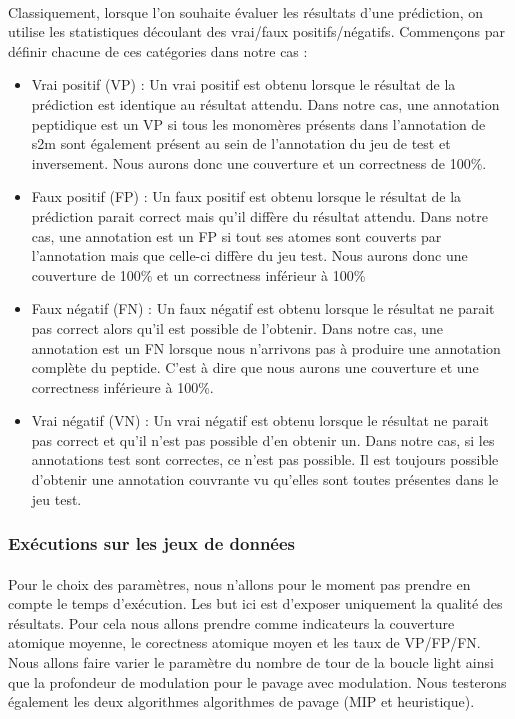 \documentclass[12pt,french,twoside]{report}
\begin{document}
\paragraph{}Classiquement, lorsque l'on souhaite évaluer les résultats d'une prédiction, on utilise les statistiques découlant des vrai/faux positifs/négatifs.
Commençons par définir chacune de ces catégories dans notre cas :
\begin{itemize}
 \item Vrai positif (VP) : Un vrai positif est obtenu lorsque le résultat de la prédiction est identique au résultat attendu.
Dans notre cas, une annotation peptidique est un VP si tous les monomères présents dans l'annotation de s2m sont également présent au sein de l'annotation du jeu de test et inversement.
Nous aurons donc une couverture et un correctness de 100\%.
 \item Faux positif (FP) : Un faux positif est obtenu lorsque le résultat de la prédiction parait correct mais qu'il diffère du résultat attendu.
Dans notre cas, une annotation est un FP si tout ses atomes sont couverts par l'annotation mais que celle-ci diffère du jeu test.
Nous aurons donc une couverture de 100\% et un correctness inférieur à 100\%
 \item Faux négatif (FN) : Un faux négatif est obtenu lorsque le résultat ne parait pas correct alors qu'il est possible de l'obtenir.
Dans notre cas, une annotation est un FN lorsque nous n'arrivons pas à produire une annotation complète du peptide.
C'est à dire que nous aurons une couverture et une correctness inférieure à 100\%.
 \item Vrai négatif (VN) : Un vrai négatif est obtenu lorsque le résultat ne parait pas correct et qu'il n'est pas possible d'en obtenir un.
Dans notre cas, si les annotations test sont correctes, ce n'est pas possible.
Il est toujours possible d'obtenir une annotation couvrante vu qu'elles sont toutes présentes dans le jeu test.
\end{itemize}


\subsubsection{Exécutions sur les jeux de données}

\label{resultats_s2m_p}

\paragraph{}Pour le choix des paramètres, nous n'allons pour le moment pas prendre en compte le temps d'exécution.
Les but ici est d'exposer uniquement la qualité des résultats.
Pour cela nous allons prendre comme indicateurs la couverture atomique moyenne, le corectness atomique moyen et les taux de VP/FP/FN.
Nous allons faire varier le paramètre du nombre de tour de la boucle light ainsi que la profondeur de modulation pour le pavage avec modulation.
Nous testerons également les deux algorithmes algorithmes de pavage (MIP et heuristique).
\end{document}

